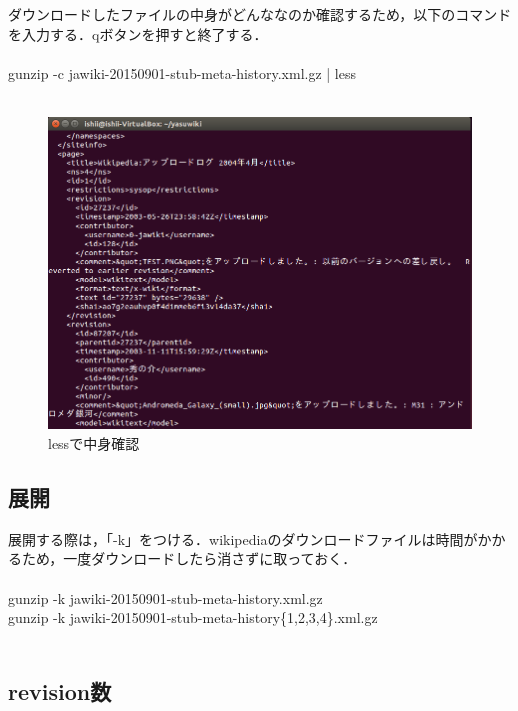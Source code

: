 ダウンロードしたファイルの中身がどんななのか確認するため，以下のコマンドを入力する．qボタンを押すと終了する．
\\
\\
gunzip -c jawiki-20150901-stub-meta-history.xml.gz | less
\\
\\
\begin{figure}[H]
\centering
\includegraphics[width=14cm]{jawiki_contents.png}
\caption{lessで中身確認}\label{サンプル図}
\end{figure}


\subsection{展開}

展開する際は，「-k」をつける．wikipediaのダウンロードファイルは時間がかかるため，一度ダウンロードしたら消さずに取っておく．
\\
\\
gunzip -k jawiki-20150901-stub-meta-history.xml.gz
\\
gunzip -k jawiki-20150901-stub-meta-history\{1,2,3,4\}.xml.gz
\\
\\







\subsection{revision数}

